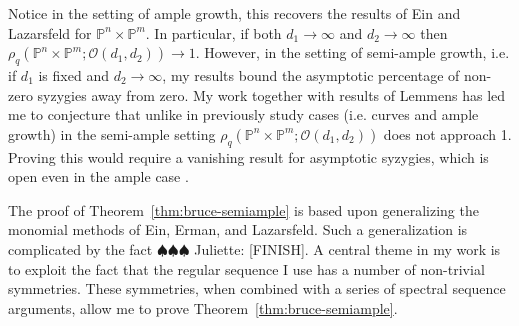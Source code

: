 \documentclass[11pt,reqno]{amsart}
\theoremstyle{remark}
\renewcommand{\O}{\mathcal{O}}
\renewcommand{\P}{\mathbb{P}}
\newcommand{\juliette}[1]{{\color{red} \sf $\spadesuit\spadesuit\spadesuit$ Juliette: [#1]}}
\begin{document}
Notice in the setting of ample growth, this recovers the results of Ein and Lazarsfeld for $\P^n\times\P^m$. In particular, if both $d_{1}\to \infty$ and $d_{2}\to\infty$ then $\rho_{q}\left(\P^{n}\times\P^{m}; \O(d_1,d_2)\right)\to 1$. However, in the setting of semi-ample growth, i.e. if $d_{1}$ is fixed and $d_{2}\to \infty$, my results bound the asymptotic percentage of non-zero syzygies away from zero. My work together with results of Lemmens \cite{lemmens18} has led me to conjecture that unlike in previously study cases (i.e. curves and ample growth) in the semi-ample setting $\rho_{q}\left(\P^{n}\times\P^{m}; \O(d_1,d_2)\right)$ does not approach 1. Proving this would require a vanishing result for asymptotic syzygies, which is open even in the ample case  \cite[Conjecture~7.1, Conjecture~7.5]{einLazarsfeld12}.





The proof of Theorem~\ref{thm:bruce-semiample} is based upon generalizing the monomial methods of Ein, Erman, and Lazarsfeld. Such a generalization is complicated by the fact \juliette{FINISH}. A central theme in my work is to exploit the fact that the regular sequence I use has a number of non-trivial symmetries. These symmetries, when combined with a series of spectral sequence arguments, allow me to prove Theorem~\ref{thm:bruce-semiample}.
\end{document}
